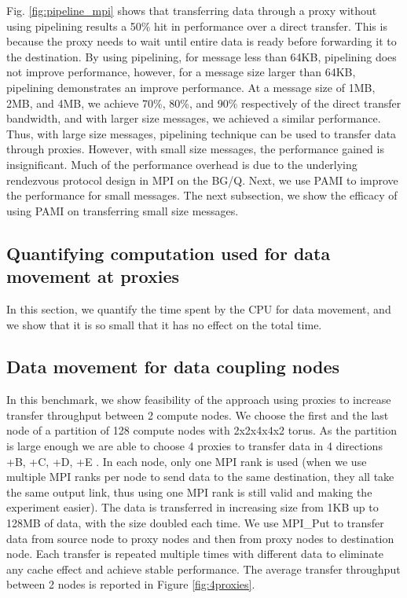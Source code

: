 \documentclass[final,5p,times]{elsarticle}
\begin{document}
Fig. \ref{fig:pipeline_mpi} shows that transferring data through a proxy without using pipelining results a 50\% hit in performance over a direct transfer. This is because the proxy needs to wait until entire data is ready before forwarding it to the destination. By using pipelining, for message less than 64KB,  pipelining does not improve performance, however, for a message size larger than 64KB, pipelining demonstrates an improve performance. At a  message size of 1MB, 2MB, and 4MB, we achieve 70\%, 80\%, and  90\% respectively of the direct transfer bandwidth, and with larger size messages, we achieved a similar performance. Thus, with large size messages, pipelining technique can be used to transfer data through proxies. However, with small size messages, the performance gained is insignificant. Much of the performance overhead is due to the underlying rendezvous protocol design in MPI on the BG/Q. Next, we use PAMI to improve the performance for small messages. The next subsection, we show the efficacy of using PAMI on transferring small size messages.

\subsection{Quantifying computation used for data movement at proxies}
In this section, we quantify the time spent by the CPU for data movement, and we show that it is so small that it has no effect on the total time.

\subsection{Data movement for data coupling nodes}
In this benchmark, we show feasibility of the approach using proxies to increase transfer throughput between 2 compute nodes. We choose the first and the last node of a partition of 128 compute nodes with 2x2x4x4x2 torus. As the partition is large enough we are able to choose 4 proxies to transfer data in 4 directions +B, +C, +D, +E . In each node, only one MPI rank is used (when we use multiple MPI ranks per node to send data to the same destination, they all take the same output link, thus using one MPI rank is still valid and making the experiment easier). The data is transferred in increasing size from 1KB up to 128MB of data, with the size doubled each time. We use MPI\_Put to transfer data from source node to proxy nodes and then from proxy nodes to destination node. Each transfer is repeated multiple times with different data to eliminate any cache effect and achieve stable performance. The average transfer throughput between 2 nodes is reported in Figure \ref{fig:4proxies}.
\end{document}
